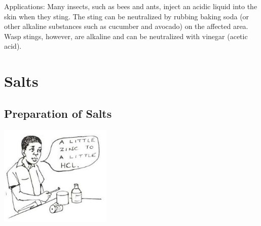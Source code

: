 \begin{multicols}{2}
\begin{description*}
\item[Applications:]{Many insects, such as bees and ants, inject an acidic liquid into the skin when they sting. The sting can be neutralized by rubbing baking soda (or other alkaline substances such as cucumber and avocado) on the affected area. Wasp stings, however, are alkaline and can be neutralized with vinegar (acetic acid).}
\end{description*}

\vfill
\pagebreak


\section*{Salts}


\subsection{Preparation of Salts}

\begin{center}
\includegraphics[width=0.4\textwidth]{./img/source/salt-acid-metal.jpg}
\end{center}


\end{multicols}
